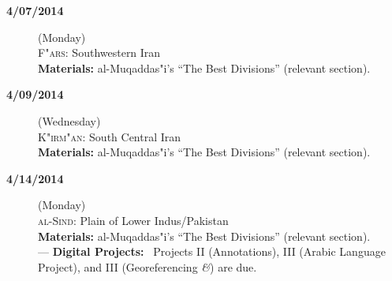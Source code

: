 \documentclass{tufte-handout} %
\def\and{\textit{\&}\xspace}
\begin{document}
\begin{description}
\noindent\hrulefill

\item[\textbf{4/07/2014}] (Monday)\\
\textsc{F"ars:} Southwestern Iran\\
\textbf{Materials:} al-Muqaddas"i's ``The Best Divisions'' (relevant section).

\item[\textbf{4/09/2014}] (Wednesday)\\
\textsc{K"irm"an:} South Central Iran\\
\textbf{Materials:} al-Muqaddas"i's ``The Best Divisions'' (relevant section).

\noindent\hrulefill

\item[\textbf{4/14/2014}] (Monday)\\
\textsc{al-Sind:} Plain of Lower Indus/Pakistan\\
\textbf{Materials:} al-Muqaddas"i's ``The Best Divisions'' (relevant section).\\
---
\textbf{Digital Projects:} \textbullet~Projects II (Annotations), III (Arabic Language Project), and III (Georeferencing \and) are due.

\end{description}
\end{document}
